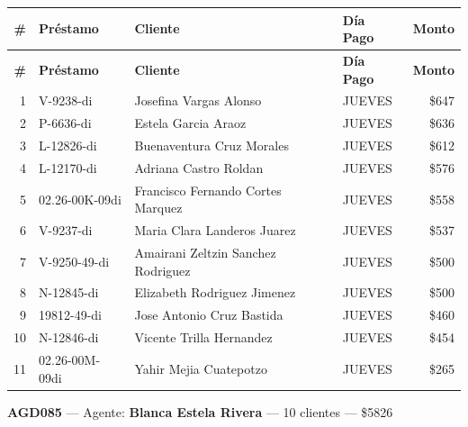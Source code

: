 \documentclass[11pt,a4paper]{article}
\newcommand{\money}[1]{\$\num{#1}}
\begin{document}
\begin{center}
\renewcommand{\arraystretch}{1.1}
\footnotesize
\begin{longtable}{rlp{6.5cm}lr}
\toprule
\textbf{\#} & \textbf{Pr\'estamo} & \textbf{Cliente} & \textbf{D\'ia Pago} & \textbf{Monto} \\
\midrule
\endfirsthead
\toprule
\textbf{\#} & \textbf{Pr\'estamo} & \textbf{Cliente} & \textbf{D\'ia Pago} & \textbf{Monto} \\
\midrule
\endhead
1 & V-9238-di & Josefina Vargas Alonso & JUEVES & \money{647} \\
2 & P-6636-di & Estela Garcia Araoz & JUEVES & \money{636} \\
3 & L-12826-di & Buenaventura Cruz Morales & JUEVES & \money{612} \\
4 & L-12170-di & Adriana Castro Roldan & JUEVES & \money{576} \\
5 & 02.26-00K-09di & Francisco Fernando Cortes Marquez & JUEVES & \money{558} \\
6 & V-9237-di & Maria Clara Landeros Juarez & JUEVES & \money{537} \\
7 & V-9250-49-di & Amairani Zeltzin Sanchez Rodriguez & JUEVES & \money{500} \\
8 & N-12845-di & Elizabeth Rodriguez Jimenez & JUEVES & \money{500} \\
9 & 19812-49-di & Jose Antonio Cruz Bastida & JUEVES & \money{460} \\
10 & N-12846-di & Vicente Trilla Hernandez & JUEVES & \money{454} \\
11 & 02.26-00M-09di & Yahir Mejia Cuatepotzo & JUEVES & \money{265} \\

\bottomrule
\end{longtable}
\end{center}
\noindent\textbf{AGD085} --- Agente: \textbf{Blanca Estela Rivera} --- 10 clientes --- \money{5826}
\end{document}
